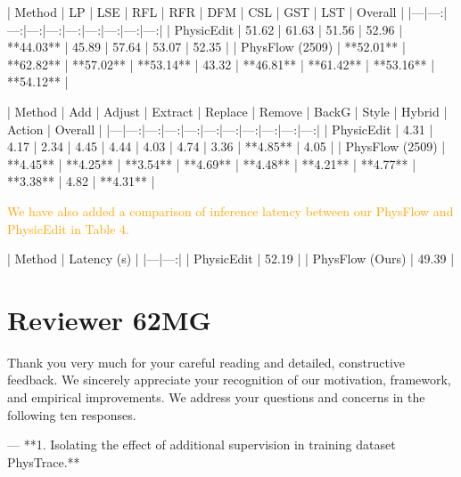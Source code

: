 \documentclass{article}
\begin{document}
| Method | LP | LSE | RFL | RFR | DFM | CSL | GST | LST | Overall |
|---|---:|---:|---:|---:|---:|---:|---:|---:|---:|
| PhysicEdit | 51.62 | 61.63 | 51.56 | 52.96 | **44.03** | 45.89 | 57.64 | 53.07 | 52.35 |
| PhysFlow (2509) | **52.01** | **62.82** | **57.02** | **53.14** | 43.32 | **46.81** | **61.42** | **53.16** | **54.12** |

| Method | Add | Adjust | Extract | Replace | Remove | BackG | Style | Hybrid | Action | Overall |
|---|---:|---:|---:|---:|---:|---:|---:|---:|---:|---:|
| PhysicEdit | 4.31 | 4.17 | 2.34 | 4.45 | 4.44 | 4.03 | 4.74 | 3.36 | **4.85** | 4.05 |
| PhysFlow (2509) | **4.45** | **4.25** | **3.54** | **4.69** | **4.48** | **4.21** | **4.77** | **3.38** | 4.82 | **4.31** |

\textcolor{orange}{
We have also added a comparison of inference latency between our PhysFlow and PhysicEdit in Table 4.
}

| Method | Latency (s) |
|---|---:|
| PhysicEdit | 52.19 |
| PhysFlow (Ours) | 49.39 |




\section{Reviewer 62MG}

Thank you very much for your careful reading and detailed, constructive feedback.
We sincerely appreciate your recognition of our motivation, framework, and empirical improvements. We address your questions and concerns in the following ten responses.

---
**1. Isolating the effect of additional supervision in training dataset PhysTrace.**

{\color{orange}{
Following your suggestion, we train a non-reasoning image editor on PhysTrace without reasoning annotations, using the same generator backbone (Qwen-Image-Edit-2511) and a comparable optimization budget to our PhysFlow.
We refer to this baseline as Qwen-Image-Edit-2511 + PhysTrace (w/o Reasoning) and report its results in Table 8.

As shown, the new baseline outperforms the original backbone by 0.86\%.
Furthermore, our latent reasoning framework further improves the overall score from 55.13\% to 56.32\% over this non-reasoning baseline, demonstrating the effectiveness of our proposed approach.
Particularly, under the same source-target image pair setting, training on our curated PhysTrace achieves higher overall performance than training on PICA100K (i.e., Qwen-Image-Edit-2511 + PICA100K (w/o Reasoning)), highlighting the benefits of its superior data quality for training efficiency.
}}
\end{document}
